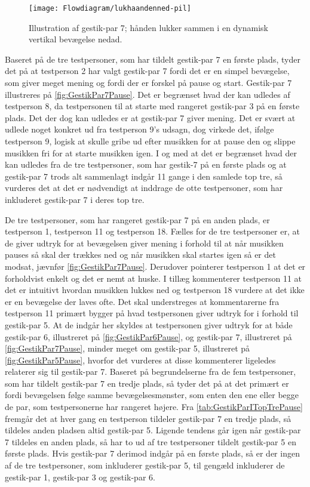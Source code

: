 %
\begin{figure}[H]
	\centering
	\texttt{[image: Flowdiagram/lukhaandenned-pil]}
	\caption{Illustration af gestik-par 7; hånden lukker sammen i en dynamisk vertikal bevægelse nedad.}
	\label{fig:GestikPar7Pause}
\end{figure}
\noindent
%
Baseret på de tre testpersoner, som har tildelt gestik-par 7 en første plads, tyder det på at testperson 2 har valgt gestik-par 7 fordi det er en simpel bevægelse, som giver meget mening og fordi der er forskel på pause og start. Gestik-par 7 illustreres på \autoref{fig:GestikPar7Pause}. Det er begrænset hvad der kan udledes af testperson 8, da testpersonen til at starte med rangeret gestik-par 3 på en første plads. Det der dog kan udledes er at gestik-par 7 giver mening. Det er svært at udlede noget konkret ud fra testperson 9's udsagn, dog virkede det, ifølge testperson 9, logisk at skulle gribe ud efter musikken for at pause den og slippe musikken fri for at starte musikken igen. I og med at det er begrænset hvad der kan udledes fra de tre testpersoner, som har gestik-7 på en første plads og at gestik-par 7 trods alt sammenlagt indgår 11 gange i den samlede top tre, så vurderes det at det er nødvendigt at inddrage de otte testpersoner, som har inkluderet gestik-par 7 i deres top tre. 

De tre testpersoner, som har rangeret gestik-par 7 på en anden plads, er testperson 1, testperson 11 og testperson 18. Fælles for de tre testpersoner er, at de giver udtryk for at bevægelsen giver mening i forhold til at når musikken pauses så skal der trækkes ned og når musikken skal startes igen så er det modsat, jævnfør \autoref{fig:GestikPar7Pause}. Derudover pointerer testperson 1 at det er forholdvist enkelt og det er nemt at huske. I tillæg kommenterer testperson 11 at det er intuitivt hvordan musikken lukkes ned og testperson 18 vurdere at det ikke er en bevægelse der laves ofte. Det skal understreges at kommentarerne fra testperson 11 primært bygger på hvad testpersonen giver udtryk for i forhold til gestik-par 5. At de indgår her skyldes at testpersonen giver udtryk for at både gestik-par 6, illustreret på \autoref{fig:GestikPar6Pause}, og gestik-par 7, illustreret på \autoref{fig:GestikPar7Pause}, minder meget om gestik-par 5, illustreret på \autoref{fig:GestikPar5Pause}, hvorfor det vurderes at disse kommenterer ligeledes relaterer sig til gestik-par 7. Baseret på begrundelserne fra de fem testpersoner, som har tildelt gestik-par 7 en tredje plads, så tyder det på at det primært er fordi bevægelsen følge samme bevægelsesmønster, som enten den ene eller begge de par, som testpersonerne har rangeret højere. Fra \autoref{tab:GestikParITopTrePause} fremgår det at hver gang en testperson tildeler gestik-par 7 en tredje plads, så tildeles anden pladsen altid gestik-par 5. Ligende tendens går igen når gestik-par 7 tildeles en anden plads, så har to ud af tre testpersoner tildelt gestik-par 5 en første plads. Hvis gestik-par 7 derimod indgår på en første plads, så er der ingen af de tre testpersoner, som inkluderer gestik-par 5, til gengæld inkluderer de gestik-par 1, gestik-par 3 og gestik-par 6. 

